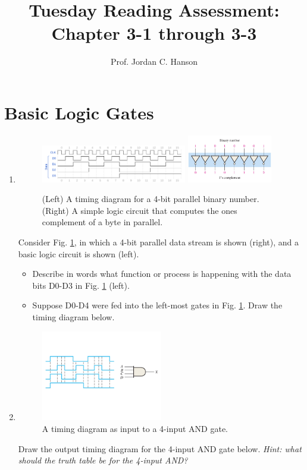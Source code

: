 \documentclass{article}
\begin{document}
\title{Tuesday Reading Assessment: Chapter 3-1 through 3-3}
\author{Prof. Jordan C. Hanson}

\maketitle


\section{Basic Logic Gates}

\begin{enumerate}
\item
\begin{figure}[ht]
\centering
\includegraphics[width=0.6\textwidth]{figures/timingExample14.pdf}
\includegraphics[width=0.35\textwidth]{figures/ones_c.pdf}
\caption{\label{fig:ones} (Left) A timing diagram for a 4-bit parallel binary number.  (Right) A simple logic circuit that computes the ones complement of a byte in parallel.}
\end{figure}
Consider Fig. \ref{fig:ones}, in which a 4-bit parallel data stream is shown (right), and a basic logic circuit is shown (left).
\begin{itemize}
\item Describe in words what function or process is happening with the data bits D0-D3 in Fig. \ref{fig:ones} (left). \\ \vspace{0.5cm}
\item Suppose D0-D4 were fed into the left-most gates in Fig. \ref{fig:ones}.  Draw the timing diagram below. \\ \vspace{2cm}
\end{itemize}
\item 
\begin{figure}
\centering
\includegraphics[width=0.5\textwidth,trim=0cm 4cm 0cm 4cm,clip=true]{4and.pdf}
\caption{\label{fig:4and} A timing diagram as input to a 4-input AND gate.}
\end{figure}
Draw the output timing diagram for the 4-input AND gate below.  \textit{Hint: what should the truth table be for the 4-input AND?}
\end{enumerate}
\end{document}

